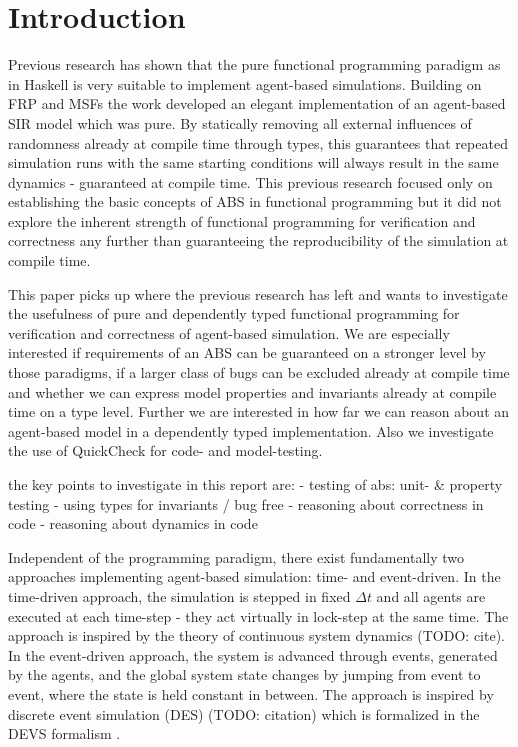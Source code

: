 \section{Introduction}
Previous research has shown that the pure functional programming paradigm as in Haskell is very suitable to implement agent-based simulations. Building on FRP and MSFs the work developed an elegant implementation of an agent-based SIR model which was pure. By statically removing all external influences of randomness already at compile time through types, this guarantees that repeated simulation runs with the same starting conditions will always result in the same dynamics - guaranteed at compile time. This previous research focused only on establishing the basic concepts of ABS in functional programming but it did not explore the inherent strength of functional programming for verification and correctness any further than guaranteeing the reproducibility of the simulation at compile time.

This paper picks up where the previous research has left and wants to investigate the usefulness of pure and dependently typed functional programming for verification and correctness of agent-based simulation. We are especially interested if requirements of an ABS can be guaranteed on a stronger level by those paradigms, if a larger class of bugs can be excluded already at compile time and whether we can express model properties and invariants already at compile time on a type level. Further we are interested in how far we can reason about an agent-based model in a dependently typed implementation. Also we investigate the use of QuickCheck for code- and model-testing.


the key points to investigate in this report are:
- testing of abs: unit- \& property testing
- using types for invariants / bug free
- reasoning about correctness in code
- reasoning about dynamics in code


Independent of the programming paradigm, there exist fundamentally two approaches implementing agent-based simulation: time- and event-driven. In the time-driven approach, the simulation is stepped in fixed $\Delta t$ and all agents are executed at each time-step - they act virtually in lock-step at the same time. The approach is inspired by the theory of continuous system dynamics (TODO: cite).
In the event-driven approach, the system is advanced through events, generated by the agents, and the global system state changes by jumping from event to event, where the state is held constant in between. The approach is inspired by discrete event simulation (DES) (TODO: citation) which is formalized in the DEVS formalism \cite{zeigler_theory_2000}.

